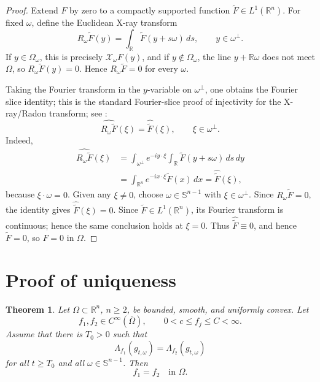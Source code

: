 \documentclass[11pt]{article}
\numberwithin{equation}{section}
\newtheorem{theorem}{Theorem}[section]
\newcommand{\R}{\mathbb R}
\newcommand{\Sn}{\mathbb S^{n-1}}
\newcommand{\Om}{\Omega}
\newcommand{\DN}{\Lambda}
\newcommand{\Xray}{\mathcal X}
\begin{document}
\begin{proof}
Extend \(F\) by zero to a compactly supported function \(\widetilde F\in L^1(\R^n)\).  For fixed \(\omega\), define the Euclidean X-ray transform
\[
    R_\omega \widetilde F(y)
    =
    \int_\R \widetilde F(y+s\omega)\,ds,
    \qquad y\in\omega^\perp .
\]
If \(y\in\Omega_\omega\), this is precisely \(\Xray_\omega F(y)\), and if \(y\notin\Omega_\omega\), the line \(y+\R\omega\) does not meet \(\Omega\), so \(R_\omega\widetilde F(y)=0\).  Hence \(R_\omega\widetilde F=0\) for every \(\omega\).

Taking the Fourier transform in the \(y\)-variable on \(\omega^\perp\), one obtains the Fourier slice identity; this is the standard Fourier-slice proof of injectivity for the X-ray/Radon transform; see \cite{Natterer2001}:
\[
    \widehat{R_\omega\widetilde F}(\xi)
    =
    \widehat{\widetilde F}(\xi),
    \qquad \xi\in\omega^\perp .
\]
Indeed,
\[
\begin{aligned}
    \widehat{R_\omega\widetilde F}(\xi)
    &=\int_{\omega^\perp} e^{-iy\cdot\xi}
        \int_\R \widetilde F(y+s\omega)\,ds\,dy  \\
    &=\int_{\R^n} e^{-ix\cdot\xi}\widetilde F(x)\,dx
     =\widehat{\widetilde F}(\xi),
\end{aligned}
\]
because \(\xi\cdot\omega=0\).  Given any \(\xi\ne0\), choose \(\omega\in\Sn\) with \(\xi\in\omega^\perp\).  Since \(R_\omega\widetilde F=0\), the identity gives \(\widehat{\widetilde F}(\xi)=0\).  Since \(\widetilde F\in L^1(\R^n)\), its Fourier transform is continuous; hence the same conclusion holds at \(\xi=0\).  Thus \(\widehat{\widetilde F}\equiv0\), and hence \(\widetilde F=0\), so \(F=0\) in \(\Omega\).
\end{proof}


\section{Proof of uniqueness}\label{sec:uniqueness-proofs}

\begin{theorem}\label{thm:large-cylindrical-uniqueness}
Let \(\Om\subset\R^n\), \(n\ge2\), be bounded, smooth, and uniformly convex.  Let
\[
    f_1,f_2\in C^\infty(\overline\Om),
    \qquad
    0<c\le f_j\le C<\infty.
\]
Assume that there is \(T_0>0\) such that
\begin{equation}\label{eq:DN-equality-large-family}
    \DN_{f_1}(g_{t,\omega})=
    \DN_{f_2}(g_{t,\omega})
\end{equation}
for all \(t\ge T_0\) and all \(\omega\in\Sn\).  Then
\[
    f_1=f_2
    \quad\text{in }\Om.
\]
\end{theorem}
\end{document}
